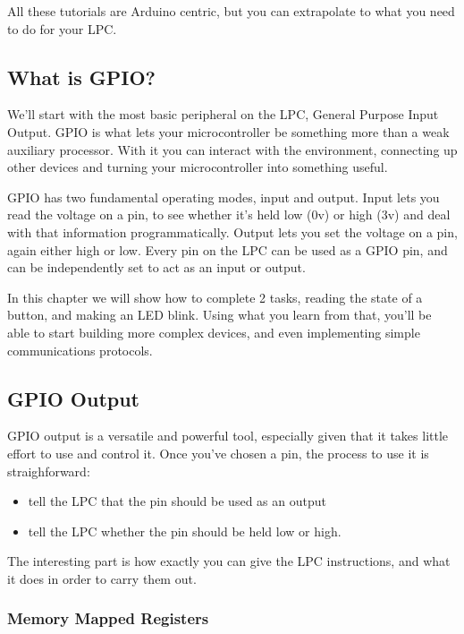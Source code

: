 \documentclass[]{article}
\begin{document}
All these tutorials are Arduino centric, but you can extrapolate to what
you need to do for your LPC.

\subsection{What is GPIO?}

We'll start with the most basic peripheral on the LPC, General Purpose
Input Output. GPIO is what lets your microcontroller be something more
than a weak auxiliary processor. With it you can interact with the
environment, connecting up other devices and turning your
microcontroller into something useful.

GPIO has two fundamental operating modes, input and output. Input lets
you read the voltage on a pin, to see whether it's held low (0v) or high
(3v) and deal with that information programmatically. Output lets you
set the voltage on a pin, again either high or low. Every pin on the LPC
can be used as a GPIO pin, and can be independently set to act as an
input or output.

In this chapter we will show how to complete 2 tasks, reading the state
of a button, and making an LED blink. Using what you learn from that,
you'll be able to start building more complex devices, and even
implementing simple communications protocols.

\subsection{GPIO Output}

GPIO output is a versatile and powerful tool, especially given that it
takes little effort to use and control it. Once you've chosen a pin, the
process to use it is straighforward:

\begin{itemize}
\itemsep1pt\parskip0pt
\item
  tell the LPC that the pin should be used as an output
\item
  tell the LPC whether the pin should be held low or high.
\end{itemize}

The interesting part is how exactly you can give the LPC instructions,
and what it does in order to carry them out.

\subsubsection{Memory Mapped Registers}
\end{document}
